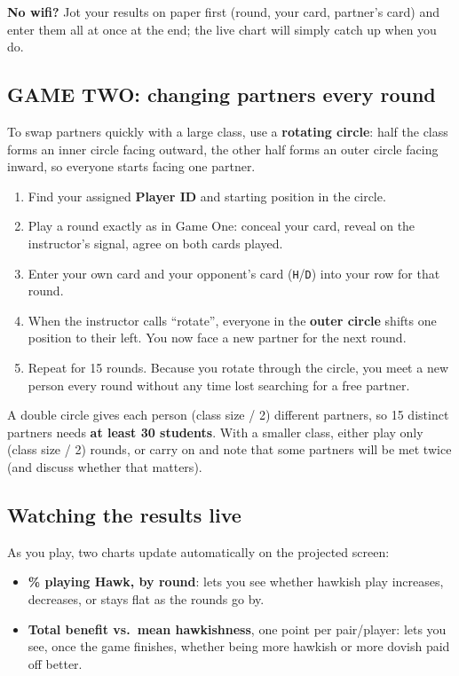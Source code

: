 \documentclass[
  a4paper]{book}
\providecommand{\tightlist}{%
  \setlength{\itemsep}{0pt}\setlength{\parskip}{0pt}}
\begin{document}
\textbf{No wifi?} Jot your results on paper first (round, your card, partner's card) and enter them all at once at the end; the live chart will simply catch up when you do.

\subsection{GAME TWO: changing partners every round}\label{game-two-changing-partners-every-round}

To swap partners quickly with a large class, use a \textbf{rotating circle}: half the class forms an inner circle facing outward, the other half forms an outer circle facing inward, so everyone starts facing one partner.

\begin{enumerate}
\def\labelenumi{\arabic{enumi}.}
\tightlist
\item
  Find your assigned \textbf{Player ID} and starting position in the circle.
\item
  Play a round exactly as in Game One: conceal your card, reveal on the instructor's signal, agree on both cards played.
\item
  Enter your own card and your opponent's card (\texttt{H}/\texttt{D}) into your row for that round.
\item
  When the instructor calls ``rotate'', everyone in the \textbf{outer circle} shifts one position to their left. You now face a new partner for the next round.
\item
  Repeat for 15 rounds. Because you rotate through the circle, you meet a new person every round without any time lost searching for a free partner.
\end{enumerate}

A double circle gives each person (class size / 2) different partners, so 15 distinct partners needs \textbf{at least 30 students}. With a smaller class, either play only (class size / 2) rounds, or carry on and note that some partners will be met twice (and discuss whether that matters).

\subsection{Watching the results live}\label{watching-the-results-live}

As you play, two charts update automatically on the projected screen:

\begin{itemize}
\tightlist
\item
  \textbf{\% playing Hawk, by round}: lets you see whether hawkish play increases, decreases, or stays flat as the rounds go by.
\item
  \textbf{Total benefit vs.~mean hawkishness}, one point per pair/player: lets you see, once the game finishes, whether being more hawkish or more dovish paid off better.
\end{itemize}
\end{document}
